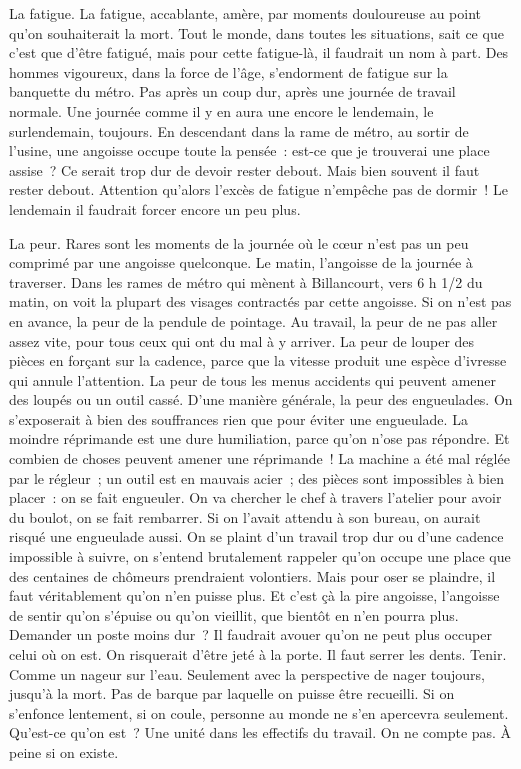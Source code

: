 \documentclass[french,twoside]{book} %
\begin{document}
La fatigue. La fatigue, accablante, amère, par moments douloureuse au point qu'on souhaiterait la mort. Tout le monde, dans toutes les situations, sait ce que c'est que d'être fatigué, mais pour cette fatigue-là, il faudrait un nom à part. Des hommes vigoureux, dans la force de l'âge, s'endorment de fatigue sur la banquette du métro. Pas après un coup dur, après une journée de travail normale. Une journée comme il y en aura une encore le lendemain, le surlendemain, toujours. En descendant dans la rame de métro, au sortir de l'usine, une angoisse occupe toute la pensée : est-ce que je trouverai une place assise ? Ce serait trop dur de devoir rester debout. Mais bien souvent il faut rester debout. Attention qu'alors l'excès de fatigue n'empêche pas de dormir ! Le lendemain il faudrait forcer encore un peu plus.\par
La peur. Rares sont les moments de la journée où le cœur n'est pas un peu comprimé par une angoisse quelconque. Le matin, l'angoisse de la journée à traverser. Dans les rames de métro qui mènent à Billancourt, vers 6 h 1/2 du matin, on voit la plupart des visages contractés par cette angoisse. Si on n'est pas en avance, la peur de la pendule de pointage. Au travail, la peur de ne pas aller assez vite, pour tous ceux qui ont du mal à y arriver. La peur de louper des pièces en forçant sur la cadence, parce que la vitesse produit une espèce d'ivresse qui annule l'attention. La peur de tous les menus accidents qui peuvent amener des loupés ou un outil cassé. D'une manière générale, la peur des engueulades. On s'exposerait à bien des souffrances rien que pour éviter une engueulade. La moindre réprimande est une dure humiliation, parce qu'on n'ose pas répondre. Et combien de choses peuvent amener une réprimande ! La machine a été mal réglée par le régleur ; un outil est en mauvais acier ; des pièces sont impossibles à bien placer : on se fait engueuler. On va chercher le chef à travers l'atelier pour avoir du boulot, on se fait rembarrer. Si on l'avait attendu à son bureau, on aurait risqué une engueulade aussi. On se plaint d'un travail trop dur ou d'une cadence impossible à suivre, on s'entend brutalement rappeler qu'on occupe une place que des centaines de chômeurs prendraient volontiers. Mais pour oser se plaindre, il faut véritablement qu'on n'en puisse plus. Et c'est çà la pire angoisse, l'angoisse de sentir qu'on s'épuise ou qu'on vieillit, que bientôt en n'en pourra plus. Demander un poste moins dur ? Il faudrait avouer qu'on ne peut plus occuper celui où on est. On risquerait d'être jeté à la porte. Il faut serrer les dents. Tenir. Comme un nageur sur l'eau. Seulement avec la perspective de nager toujours, jusqu'à la mort. Pas de barque par laquelle on puisse être recueilli. Si on s'enfonce lentement, si on coule, personne au monde ne s'en apercevra seulement. Qu'est-ce qu'on est ? Une unité dans les effectifs du travail. On ne compte pas. À peine si on existe.\par
\end{document}

